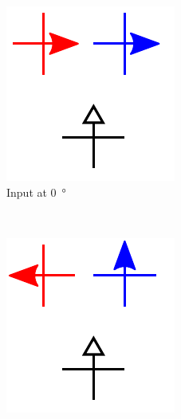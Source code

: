 \documentclass[11pt,a4paper,english]{article}
\newcommand{\rulesep}{\unskip\ \vrule\ }
\begin{document}
\begin{figure}
\centering
\begin{subfigure}[t]{0.23\textwidth}
    \includegraphics[width=\textwidth]{Figures/half_adder/schematic/000006_inputs_In2_0213/Input 0 deg.pdf}
    \caption{Input at \SI{0}{\degree}}
\end{subfigure}
\rulesep
\begin{subfigure}[t]{0.23\textwidth}
    \includegraphics[width=\textwidth]{Figures/half_adder/schematic/000006_inputs_In2_0213/Input 90 deg.pdf}

\end{subfigure}
\end{figure}
\end{document}
